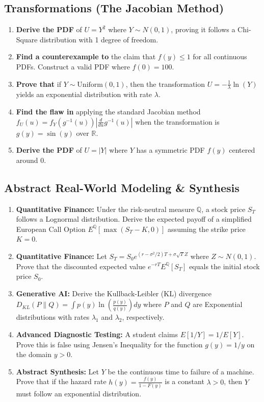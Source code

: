 \documentclass[11pt, a4paper]{article}
\theoremstyle{definition}
\theoremstyle{remark}
\newcommand{\R}{\mathbb{R}}
\newcommand{\Q}{\mathbb{Q}}
\begin{document}
\subsection{Transformations (The Jacobian Method)}
\begin{enumerate}[label=\textbf{\arabic*.}, resume]
    \item \textbf{Derive the PDF} of $U = Y^2$ where $Y \sim N(0,1)$, proving it follows a Chi-Square distribution with 1 degree of freedom.
    \item \textbf{Find a counterexample to} the claim that $f(y) \le 1$ for all continuous PDFs. Construct a valid PDF where $f(0) = 100$.
    \item \textbf{Prove that} if $Y \sim \text{Uniform}(0,1)$, then the transformation $U = -\frac{1}{\lambda} \ln(Y)$ yields an exponential distribution with rate $\lambda$.
    \item \textbf{Find the flaw in} applying the standard Jacobian method $f_U(u) = f_Y(g^{-1}(u)) \left| \frac{d}{du} g^{-1}(u) \right|$ when the transformation is $g(y) = \sin(y)$ over $\R$.
    \item \textbf{Derive the PDF} of $U = |Y|$ where $Y$ has a symmetric PDF $f(y)$ centered around $0$.
\end{enumerate}

\subsection{Abstract Real-World Modeling \& Synthesis}
\begin{enumerate}[label=\textbf{\arabic*.}, resume]
    \item \textbf{Quantitative Finance:} Under the risk-neutral measure $\Q$, a stock price $S_T$ follows a Lognormal distribution. Derive the expected payoff of a simplified European Call Option $E^\Q[\max(S_T - K, 0)]$ assuming the strike price $K=0$.
    \item \textbf{Quantitative Finance:} Let $S_T = S_0 e^{(r-\sigma^2/2)T + \sigma \sqrt{T} Z}$ where $Z \sim N(0,1)$. Prove that the discounted expected value $e^{-rT} E^\Q[S_T]$ equals the initial stock price $S_0$.
    \item \textbf{Generative AI:} Derive the Kullback-Leibler (KL) divergence $D_{KL}(P \parallel Q) = \int p(y) \ln\left(\frac{p(y)}{q(y)}\right) dy$ where $P$ and $Q$ are Exponential distributions with rates $\lambda_1$ and $\lambda_2$, respectively.
    \item \textbf{Advanced Diagnostic Testing:} A student claims $E[1/Y] = 1/E[Y]$. Prove this is false using Jensen's Inequality for the function $g(y) = 1/y$ on the domain $y > 0$.
    \item \textbf{Abstract Synthesis:} Let $Y$ be the continuous time to failure of a machine. Prove that if the hazard rate $h(y) = \frac{f(y)}{1-F(y)}$ is a constant $\lambda > 0$, then $Y$ must follow an exponential distribution.
\end{enumerate}
\end{document}
